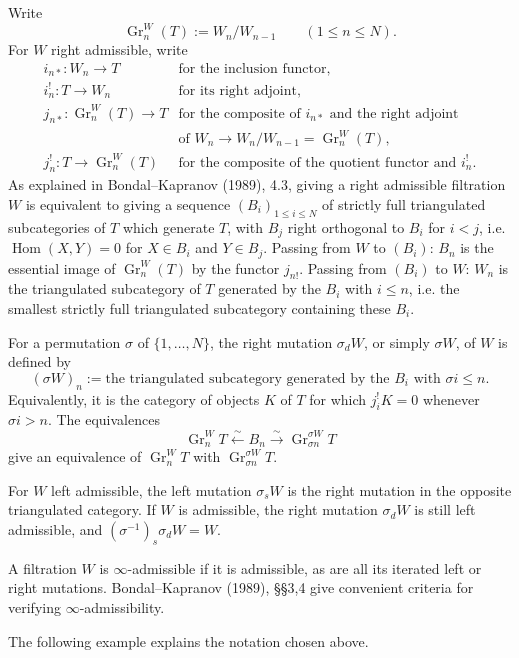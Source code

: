 \documentclass[11pt]{article}
\newcommand{\Hom}{\operatorname{Hom}}
\newcommand{\Gr}{\operatorname{Gr}}
\begin{document}
Write
\[
 \Gr^W_n(T):=W_n/W_{n-1}\qquad (1\leq n\leq N).
\]
For $W$ right admissible, write
\[
\begin{array}{ll}
 i_{n*}:W_n\to T & \text{for the inclusion functor},\\
 i_n^!:T\to W_n & \text{for its right adjoint},\\
 j_{n*}:\Gr^W_n(T)\to T & \text{for the composite of }i_{n*}\text{ and the right adjoint}\\
 & \text{of }W_n\to W_n/W_{n-1}=\Gr^W_n(T),\\
 j_n^!:T\to \Gr^W_n(T) & \text{for the composite of the quotient functor and }i_n^!.
\end{array}
\]
As explained in Bondal--Kapranov (1989), 4.3, giving a right admissible filtration $W$ is equivalent to giving a sequence $(B_i)_{1\leq i\leq N}$ of strictly full triangulated subcategories of $T$ which generate $T$, with $B_j$ right orthogonal to $B_i$ for $i<j$, i.e. $\Hom(X,Y)=0$ for $X\in B_i$ and $Y\in B_j$. Passing from $W$ to $(B_i)$: $B_n$ is the essential image of $\Gr^W_n(T)$ by the functor $j_{n!}$. Passing from $(B_i)$ to $W$: $W_n$ is the triangulated subcategory of $T$ generated by the $B_i$ with $i\leq n$, i.e. the smallest strictly full triangulated subcategory containing these $B_i$.

For a permutation $\sigma$ of $\{1,\ldots,N\}$, the right mutation $\sigma_dW$, or simply $\sigma W$, of $W$ is defined by
\[
 (\sigma W)_n := \text{the triangulated subcategory generated by the }B_i\text{ with }\sigma i\leq n.
\]
Equivalently, it is the category of objects $K$ of $T$ for which $j_i^!K=0$ whenever $\sigma i>n$. The equivalences
\begin{equation}
 \Gr^W_n T \xleftarrow{\sim} B_n \xrightarrow{\sim} \Gr_{\sigma n}^{\sigma W}T
\tag{0.2}
\end{equation}
give an equivalence of $\Gr^W_n T$ with $\Gr_{\sigma n}^{\sigma W}T$.

For $W$ left admissible, the left mutation $\sigma_sW$ is the right mutation in the opposite triangulated category. If $W$ is admissible, the right mutation $\sigma_dW$ is still left admissible, and $(\sigma^{-1})_s\sigma_dW=W$.

A filtration $W$ is $\infty$-admissible if it is admissible, as are all its iterated left or right mutations. Bondal--Kapranov (1989), \S\S3,4 give convenient criteria for verifying $\infty$-admissibility.

The following example explains the notation chosen above.
\end{document}
